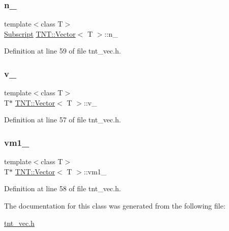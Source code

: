 \subsubsection{\texorpdfstring{n\+\_\+}{n\_}}
{\footnotesize\ttfamily template$<$class T$>$ \\
\hyperlink{namespaceTNT_af22e3f1460e145c04ce4e7d701e4c1c1}{Subscript} \hyperlink{classTNT_1_1Vector}{T\+N\+T\+::\+Vector}$<$ T $>$\+::n\+\_\+\hspace{0.3cm}{\ttfamily [protected]}}



Definition at line 59 of file tnt\+\_\+vec.\+h.

\mbox{\label{classTNT_1_1Vector_a67b413bf6956350ff9dda9faee707433}} 
\subsubsection{\texorpdfstring{v\+\_\+}{v\_}}
{\footnotesize\ttfamily template$<$class T$>$ \\
T$\ast$ \hyperlink{classTNT_1_1Vector}{T\+N\+T\+::\+Vector}$<$ T $>$\+::v\+\_\+\hspace{0.3cm}{\ttfamily [protected]}}



Definition at line 57 of file tnt\+\_\+vec.\+h.

\mbox{\label{classTNT_1_1Vector_a55f5ebf43f5af53aabdfae15a1ce11d4}} 
\subsubsection{\texorpdfstring{vm1\+\_\+}{vm1\_}}
{\footnotesize\ttfamily template$<$class T$>$ \\
T$\ast$ \hyperlink{classTNT_1_1Vector}{T\+N\+T\+::\+Vector}$<$ T $>$\+::vm1\+\_\+\hspace{0.3cm}{\ttfamily [protected]}}



Definition at line 58 of file tnt\+\_\+vec.\+h.



The documentation for this class was generated from the following file\+:\begin{DoxyCompactItemize}
\item 
\hyperlink{tnt__vec_8h}{tnt\+\_\+vec.\+h}\end{DoxyCompactItemize}

